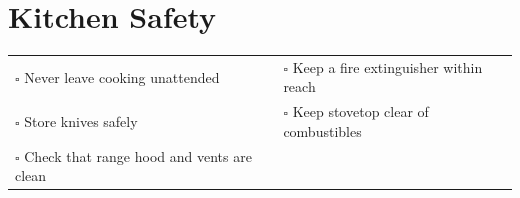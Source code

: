
\section{Kitchen Safety}
\label{sec:kitchen}

\begin{tabular}{p{9cm} p{8cm}}
$\square$ Never leave cooking unattended & $\square$ Keep a fire extinguisher within reach \\ 
$\square$ Store knives safely & $\square$ Keep stovetop clear of combustibles \\ 
$\square$ Check that range hood and vents are clean & \\ 
\end{tabular}


